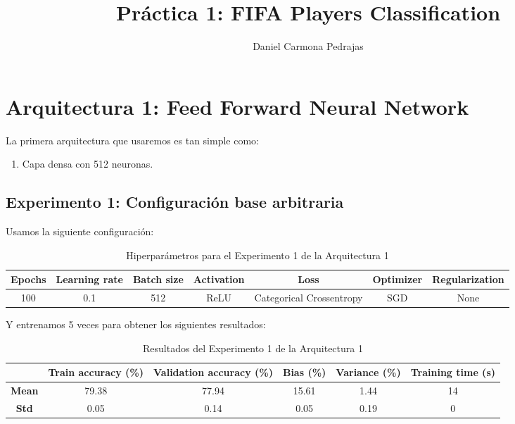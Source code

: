 \documentclass{article}
\begin{document}
\title{Pr\'actica 1: FIFA Players Classification}

\author{{Daniel Carmona Pedrajas}}

\date{}
\maketitle



	\section{Arquitectura 1: Feed Forward Neural Network}
		La primera arquitectura que usaremos es tan simple como:
		\begin{enumerate}
			\item Capa densa con 512 neuronas.
		\end{enumerate}
		\subsection{Experimento 1: Configuraci\'on base arbitraria}
		\label{s-a1-e1}
			Usamos la siguiente configuraci\'on:
			\begin{table}[!h]
				\begin{center}
					\begin{tabular}{| c | c | c | c | c | c | c |}
						\textbf{Epochs} & \textbf{Learning rate} & \textbf{Batch size} & \textbf{Activation} & \textbf{Loss} & \textbf{Optimizer} & \textbf{Regularization} \\ \hline
						100 & 0.1 & 512 & ReLU & Categorical Crossentropy & SGD & None
					\end{tabular}
					\caption{Hiperpar\'ametros para el Experimento 1 de la Arquitectura 1}
					\label{tab:hip-a1-e1}
				\end{center}
			\end{table}
		
			Y entrenamos 5 veces para obtener los siguientes resultados:
			\begin{table}[!h]
				\begin{center}
					\begin{tabular}{ c | c | c | c | c | c |}
						\ & \textbf{Train accuracy (\%)} & \textbf{Validation accuracy (\%)} & \textbf{Bias (\%)} & \textbf{Variance (\%)} & \textbf{Training time (s)} \\ \hline
						\textbf{Mean} & 79.38 & 77.94 & 15.61 & 1.44 & 14\\ \hline
						\textbf{Std} & 0.05 & 0.14 & 0.05 & 0.19 & 0 \\ \hline
					\end{tabular}
					\caption{Resultados del Experimento 1 de la Arquitectura 1}
					\label{tab:res-a1-e1}
				\end{center}
			\end{table}
		
\end{document}
